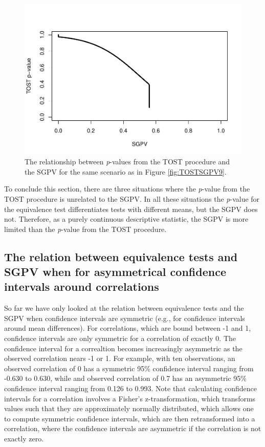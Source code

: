 \documentclass[,man,floatsintext]{apa6}
\begin{document}
\begin{figure}
\centering
\includegraphics{manuscript.R1_files/figure-latex/TOSTSGPV10-1.pdf}
\caption{\label{fig:TOSTSGPV10}The relationship between \emph{p}-values from
the TOST procedure and the SGPV for the same scenario as in Figure
\ref{fig:TOSTSGPV9}.}
\end{figure}

To conclude this section, there are three situations where the
\emph{p}-value from the TOST procedure is unrelated to the SGPV. In all
these situations the \emph{p}-value for the equivalence test
differentiates tests with different means, but the SGPV does not.
Therefore, as a purely continuous descriptive statistic, the SGPV is
more limited than the \emph{p}-value from the TOST procedure.

\subsection{The relation between equivalence tests and SGPV when for
asymmetrical confidence intervals around
correlations}\label{the-relation-between-equivalence-tests-and-sgpv-when-for-asymmetrical-confidence-intervals-around-correlations}

So far we have only looked at the relation between equivalence tests and
the SGPV when confidence intervals are symmetric (e.g., for confidence
intervals around mean differences). For correlations, which are bound
between -1 and 1, confidence intervals are only symmetric for a
correlation of exactly 0. The confidence interval for a correaltion
becomes increasingly asymmetric as the observed correlation nears -1 or
1. For example, with ten observations, an observed correlation of 0 has
a symmetric 95\% confidence interval ranging from -0.630 to 0.630, while
and observed correlation of 0.7 has an asymmetric 95\% confidence
interval ranging from 0.126 to 0.993. Note that calculating confidence
intervals for a correlation involves a Fisher's z-transformation, which
transforms values such that they are approximately normally distributed,
which allows one to compute symmetric confidence intervals, which are
then retransformed into a correlation, where the confidence intervals
are asymmetric if the correlation is not exactly zero.
\end{document}
